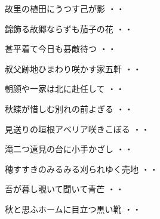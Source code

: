 \vspace{0.6cm}
\begin{shiika}故里の植田にうつす己が影
\hfill{・・}\end{shiika}
\vspace{0.6cm}
\begin{shiika}錦飾る故郷ならずも茄子の花
\hfill{・・}\end{shiika}
\vspace{0.6cm}
\begin{shiika}甚平着て今日も碁敵待つ
\hfill{・・}\end{shiika}
\vspace{0.6cm}
\begin{shiika}叔父跡地ひまわり咲かす家五軒
\hfill{・・}\end{shiika}
\vspace{0.6cm}
\begin{shiika}朝顔や一家は北に赴任して
\hfill{・・}\end{shiika}
\vspace{0.6cm}
\begin{shiika}秋蝶が惜しむ別れの前よぎる
\hfill{・・}\end{shiika}
\vspace{0.6cm}
\begin{shiika}見送りの垣根アベリア咲きこぼる
\hfill{・・}\end{shiika}
\vspace{0.6cm}
\begin{shiika}滝二つ遠見の台に小手かざし
\hfill{・・}\end{shiika}
\vspace{0.6cm}
\begin{shiika}穂すすきのみるみる刈られゆく売地
\hfill{・・}\end{shiika}
\vspace{0.6cm}
\begin{shiika}吾が暮し覗いて聞いて青芒
\hfill{・・}\end{shiika}
\vspace{0.6cm}
\begin{shiika}秋と思ふホームに目立つ黒い靴
\hfill{・・}\end{shiika}
